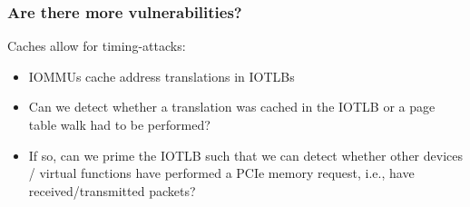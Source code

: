 \begin{frame}
    \frametitle{Are there more vulnerabilities?}

    Caches allow for timing-attacks:

    \begin{itemize}
        \item IOMMUs cache address translations in IOTLBs
        \item Can we detect whether a translation was cached in the IOTLB or a
            page table walk had to be performed?
        \item If so, can we prime the IOTLB such that we can detect whether
            other devices / virtual functions have performed a PCIe memory
            request, i.e., have received/transmitted packets?
    \end{itemize}
\end{frame}

